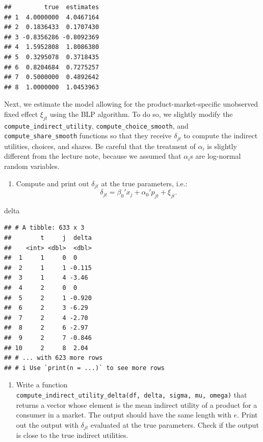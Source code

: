 \documentclass[
]{book}
\newenvironment{Shaded}{\begin{snugshade}}{\end{snugshade}}
\newcommand{\NormalTok}[1]{#1}
\providecommand{\tightlist}{%
  \setlength{\itemsep}{0pt}\setlength{\parskip}{0pt}}
\begin{document}
\begin{verbatim}
##         true  estimates
## 1  4.0000000  4.0467164
## 2  0.1836433  0.1707430
## 3 -0.8356286 -0.8092369
## 4  1.5952808  1.8086380
## 5  0.3295078  0.3718435
## 6  0.8204684  0.7275257
## 7  0.5000000  0.4892642
## 8  1.0000000  1.0453963
\end{verbatim}

Next, we estimate the model allowing for the product-market-specific unobserved fixed effect \(\xi_{jt}\) using the BLP algorithm. To do so, we slightly modify the \texttt{compute\_indirect\_utility}, \texttt{compute\_choice\_smooth}, and \texttt{compute\_share\_smooth} functions so that they receive \(\delta_{jt}\) to compute the indirect utilities, choices, and shares. Be careful that the treatment of \(\alpha_i\) is slightly different from the lecture note, because we assumed that \(\alpha_i\)s are log-normal random variables.

\begin{enumerate}
\def\labelenumi{\arabic{enumi}.}
\setcounter{enumi}{3}
\tightlist
\item
  Compute and print out \(\delta_{jt}\) at the true parameters, i.e.:
  \[
  \delta_{jt} = \beta_0' x_j + \alpha_0' p_{jt} + \xi_{jt}.
  \]
\end{enumerate}

\begin{Shaded}
\begin{Highlighting}[]
\NormalTok{delta}
\end{Highlighting}
\end{Shaded}

\begin{verbatim}
## # A tibble: 633 x 3
##        t     j  delta
##    <int> <dbl>  <dbl>
##  1     1     0  0    
##  2     1     1 -0.115
##  3     1     4 -3.46 
##  4     2     0  0    
##  5     2     1 -0.920
##  6     2     3 -6.29 
##  7     2     4 -2.70 
##  8     2     6 -2.97 
##  9     2     7 -0.846
## 10     2     8  2.04 
## # ... with 623 more rows
## # i Use `print(n = ...)` to see more rows
\end{verbatim}

\begin{enumerate}
\def\labelenumi{\arabic{enumi}.}
\setcounter{enumi}{4}
\tightlist
\item
  Write a function \texttt{compute\_indirect\_utility\_delta(df,\ delta,\ sigma,\ mu,\ omega)} that returns a vector whose element is the mean indirect utility of a product for a consumer in a market. The output should have the same length with \(e\). Print out the output with \(\delta_{jt}\) evaluated at the true parameters. Check if the output is close to the true indirect utilities.
\end{enumerate}
\end{document}
